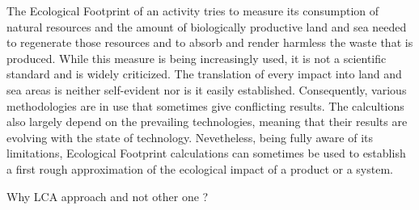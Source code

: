 The Ecological Footprint of an activity tries to measure its consumption of natural resources and the amount of biologically productive land and sea needed to regenerate those resources and to absorb and render harmless the waste that is produced. While this measure is being increasingly used, it is not a scientific standard and is widely criticized. The translation of every impact into land and sea areas is neither self-evident nor is it easily established. Consequently, various methodologies are in use that sometimes give conflicting results. The calcultions also largely depend on the prevailing technologies, meaning that their results are evolving with the state of technology. Nevetheless, being fully aware of its limitations, Ecological Footprint calculations can sometimes be used to establish a first rough approximation of the ecological impact of a product or a system.




Why LCA approach and not other one ?

